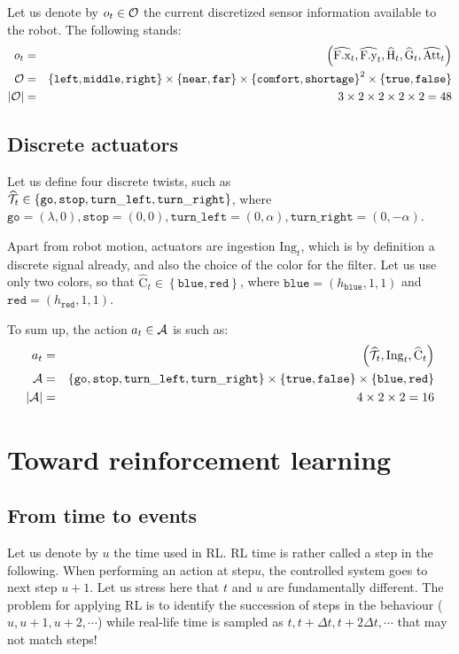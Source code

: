 \documentclass[10pt,a4paper]{article}
\newcommand{\True}[0]{\mathtt{true}}
\newcommand{\False}[0]{\mathtt{false}}
\newcommand{\Diff}[1]{{\Delta #1}}
\newcommand{\AttrOf}[2]{{#1}.\mathrm{#2}}
\newcommand{\Xof}[1]{\AttrOf{#1}x}
\newcommand{\Yof}[1]{\AttrOf{#1}y}
\newcommand{\Group}[1]{{\left({#1}\right)}}
\newcommand{\Pair}[2]{\left({#1},{#2}\right)}
\newcommand{\Set}[1]{\left\{ {#1} \right\}}
\newcommand{\At}[2]{#1_{#2}}
\newcommand{\AtT}[1]{\At{#1}t}
\newcommand{\Attent}[0]{\mathrm{Att}}
\newcommand{\Interest}[0]{\mathrm{C}}
\newcommand{\Focus}[0]{\mathrm{F}}
\newcommand{\Hydro}[0]{\mathrm{H}}
\newcommand{\Glyco}[0]{\mathrm{G}}
\newcommand{\Twist}[0]{{\cal T}}
\newcommand{\Ingest}[0]{\mathrm{Ing}}
\newcommand{\AngularMax}[0]{\alpha}
\newcommand{\LinearMax}[0]{\lambda}
\newcommand{\Card}[1]{\left| {#1} \right|}
\newcommand{\Discr}[1]{\widehat{#1}}
\newcommand{\Label}[1]{\mathtt{#1}}
\newcommand{\Left}[0]{\Label{left}}
\newcommand{\Middle}[0]{\Label{middle}}
\newcommand{\Right}[0]{\Label{right}}
\newcommand{\Far}[0]{\Label{far}}
\newcommand{\Near}[0]{\Label{near}}
\newcommand{\Comfort}[0]{\Label{comfort}}
\newcommand{\Shortage}[0]{\Label{shortage}}
\newcommand{\Go}[0]{\Label{go}}
\newcommand{\Stop}[0]{\Label{stop}}
\newcommand{\TurnLeft}[0]{\Label{turn\_left}}
\newcommand{\TurnRight}[0]{\Label{turn\_right}}
\newcommand{\Red}[0]{\Label{red}}
\newcommand{\Blue}[0]{\Label{blue}}
\newcommand{\ObsSet}{{\cal O}}
\newcommand{\Obs}{o}
\newcommand{\ActionSet}{{\cal A}}
\newcommand{\Act}{a}
\begin{document}
Let us denote by $\AtT \Obs \in \ObsSet$ the current discretized sensor information available to the robot. The following stands:
\begin{eqnarray}
\AtT \Obs &=& \Group{\AtT {\Discr{\Xof\Focus}}, \AtT {\Discr{\Yof\Focus}}, \AtT {\Discr{\Hydro}}, \AtT {\Discr{\Glyco}},\AtT {\Discr\Attent}} \\
\ObsSet &=& \Set{\Label{\Left},\Label{\Middle},\Label{\Right}}\times\Set{\Label{\Near},\Label{\Far}}
\times\Set{\Label{\Comfort},\Label{\Shortage}}^2\times\Set{\True,\False} \\
\Card \ObsSet &=& 3\times 2\times 2\times 2\times  2  = 48
\end{eqnarray}

\subsection{Discrete actuators}

Let us define four discrete twists, such as $\AtT{\Discr\Twist} \in \Set{\Go,\Stop,\TurnLeft,\TurnRight}$, where $\Go = \Pair \LinearMax 0, \Stop = \Pair 00, \TurnLeft = \Pair 0\AngularMax, \TurnRight = \Pair 0{-\AngularMax}$.

Apart from robot motion, actuators are ingestion $\AtT\Ingest$, which is by definition a discrete signal already, and also the choice of the color for the filter. Let us use only two colors, so that $\AtT{\Discr\Interest} \in \Set{\Blue,\Red}$, where $\Blue = \Group{h_\Blue,1,1}$ and $\Red = \Group{h_\Red,1,1}$.

To sum up, the action $\AtT\Act \in \ActionSet$ is such as:
\begin{eqnarray}
\AtT \Act &=& \Group{\AtT{\Discr\Twist},\AtT\Ingest,\AtT{\Discr\Interest}} \\
\ActionSet &=& \Set{\Go,\Stop,\TurnLeft,\TurnRight} \times \Set{\True,\False} \times  \Set{\Blue,\Red} \\
\Card \ActionSet &=& 4\times 2\times 2 = 16
\end{eqnarray}

\section{Toward reinforcement learning}

\subsection{From time to events}

Let us denote by $u$ the time used in RL. RL time is rather called a step in the following. When performing an action at step$u$, the controlled system goes to next step $u+1$. Let us stress here that $t$ and $u$ are fundamentally different. The problem for applying RL is to identify the succession of steps in the behaviour ($u,u+1,u+2,\cdots$) while real-life time is sampled as $t,t+\Diff t, t+2\Diff t,\cdots$ that may not match steps!
\end{document}
